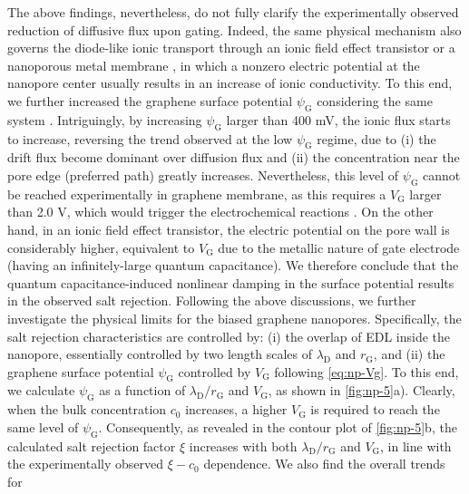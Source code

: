 The above findings, nevertheless, do not fully clarify the
experimentally observed reduction of diffusive flux upon
gating. Indeed, the same physical mechanism also governs the {
  diode-like ionic transport through an ionic field effect transistor
  \cite{Nam_2009_IFET_sub10nm,Lee_2015_sub10nm,Feng_2016_porous_MoS2} or a nanoporous metal membrane
  \cite{Mccurry_2017_electrolyte_porus_gold}}, in which a nonzero electric
potential at the nanopore center usually results in an increase of
ionic conductivity. To this end, we further increased the graphene
surface potential $\psi_{\mathrm{G}}$ considering the same system
.
%
Intriguingly,
by increasing $\psi_{\mathrm{G}}$ larger than 400 mV, the ionic flux
starts to increase, reversing the trend observed at the low
$\psi_{\mathrm{G}}$ regime, due to (i) the drift flux become dominant
over diffusion flux and (ii) the concentration near the pore edge
(preferred path) greatly increases.
%
Nevertheless, this level of $\psi_{\mathrm{G}}$ cannot be
reached experimentally in graphene membrane, as this requires a
$V_{\mathrm{G}}$ larger than 2.0 V, which would trigger the electrochemical
reactions \cite{Toh_2011_GO_electrochem}.
%
On the other hand, in an ionic field effect transistor, the electric
potential on the pore wall is considerably higher, equivalent to
$V_{\mathrm{G}}$ due to the metallic nature of gate electrode (having
an infinitely-large quantum capacitance). We therefore conclude that
the quantum capacitance-induced nonlinear damping in the surface
potential results in the observed salt rejection.  Following the above
discussions, we further investigate the physical limits for the biased
graphene nanopores. Specifically, the salt rejection characteristics
are controlled by: (i) the overlap of EDL inside the nanopore,
essentially controlled by two length scales of $\lambda_{\mathrm{D}}$
and $r_{\mathrm{G}}$, and (ii) the graphene surface potential
$\psi_{\mathrm{G}}$ controlled by $V_{\mathrm{G}}$ following
 \autoref{eq:np-Vg}. To this end, we calculate $\psi_{\mathrm{G}}$ as a
function of $\lambda_{\mathrm{D}} / r_{\mathrm{G}}$ and
$V_{\mathrm{G}}$, as shown in  \autoref{fig:np-5}a).
%
Clearly, when the bulk
concentration $c_{0}$ increases, a higher $V_{\mathrm{G}}$ is required
to reach the same level of $\psi_{\mathrm{G}}$. Consequently, as
revealed in  the contour plot of \autoref{fig:np-5}b, the calculated salt rejection factor
$\xi$ increases with both $\lambda_{\mathrm{D}} / r_{\mathrm{G}}$ and
$V_{\mathrm{G}}$, in line with the experimentally observed
$\xi - c_{0}$ dependence. We also find the overall trends for
